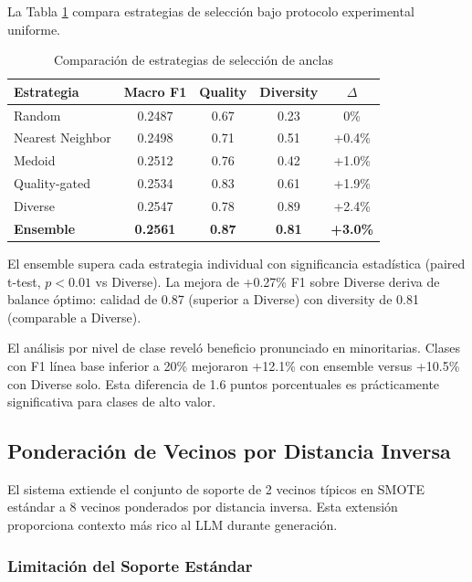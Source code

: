 La Tabla \ref{tab:anchor_strategies} compara estrategias de selección bajo protocolo experimental uniforme.

\begin{table}[h]
\centering
\caption{Comparación de estrategias de selección de anclas}
\label{tab:anchor_strategies}
\begin{tabular}{lcccc}
\hline
Estrategia & Macro F1 & Quality & Diversity & $\Delta$ \\
\hline
Random & 0.2487 & 0.67 & 0.23 & 0\% \\
Nearest Neighbor & 0.2498 & 0.71 & 0.51 & +0.4\% \\
Medoid & 0.2512 & 0.76 & 0.42 & +1.0\% \\
Quality-gated & 0.2534 & 0.83 & 0.61 & +1.9\% \\
Diverse & 0.2547 & 0.78 & 0.89 & +2.4\% \\
\textbf{Ensemble} & \textbf{0.2561} & \textbf{0.87} & \textbf{0.81} & \textbf{+3.0\%} \\
\hline
\end{tabular}
\end{table}

El ensemble supera cada estrategia individual con significancia estadística (paired t-test, $p<0.01$ vs Diverse). La mejora de +0.27\% F1 sobre Diverse deriva de balance óptimo: calidad de 0.87 (superior a Diverse) con diversity de 0.81 (comparable a Diverse).

El análisis por nivel de clase reveló beneficio pronunciado en minoritarias. Clases con F1 línea base inferior a 20\% mejoraron +12.1\% con ensemble versus +10.5\% con Diverse solo. Esta diferencia de 1.6 puntos porcentuales es prácticamente significativa para clases de alto valor.

\subsection{Ponderación de Vecinos por Distancia Inversa}
\label{subsec:ponderacion_vecinos}

El sistema extiende el conjunto de soporte de 2 vecinos típicos en SMOTE estándar a 8 vecinos ponderados por distancia inversa. Esta extensión proporciona contexto más rico al LLM durante generación.

\subsubsection*{Limitación del Soporte Estándar}

